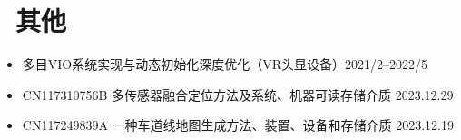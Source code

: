 \documentclass{resume}
\begin{document}

\section{\faCode\ 其他}
\begin{itemize}[parsep=0.5ex]
  \item 多目VIO系统实现与动态初始化深度优化（VR头显设备）{2021/2--2022/5}
  \item CN117310756B 多传感器融合定位方法及系统、机器可读存储介质 2023.12.29
  \item CN117249839A 一种车道线地图生成方法、装置、设备和存储介质 2023.12.19
\end{itemize}

%
%
\end{document}
